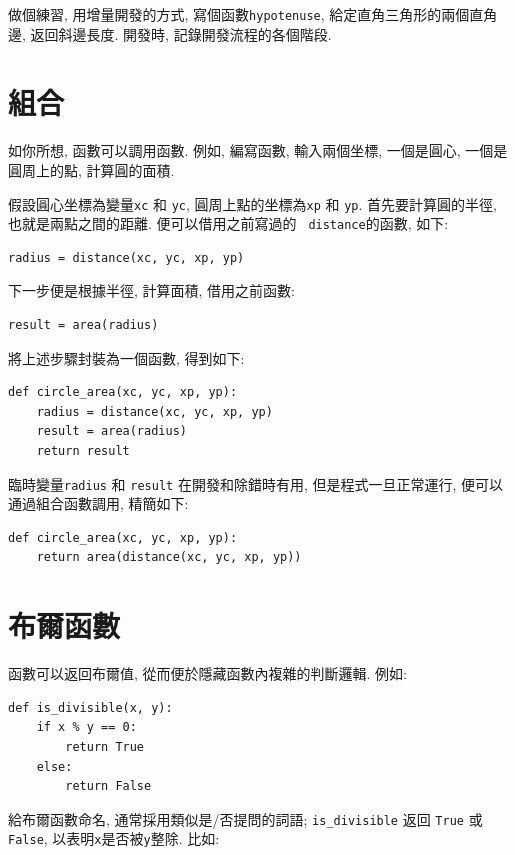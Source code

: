 \documentclass[10pt]{book}
\begin{document}
做個練習, 用增量開發的方式, 寫個函數{\tt hypotenuse}, 
給定直角三角形的兩個直角邊, 返回斜邊長度. 
開發時, 記錄開發流程的各個階段. 



\section{組合}

如你所想, 函數可以調用函數. 
例如, 編寫函數, 輸入兩個坐標, 一個是圓心, 一個是圓周上的點, 
計算圓的面積. 

假設圓心坐標為變量{\tt xc} 和
{\tt yc}, 圓周上點的坐標為{\tt xp} 和 {\tt yp}.
首先要計算圓的半徑, 也就是兩點之間的距離. 
便可以借用之前寫過的 {\tt
distance}的函數, 如下:

\begin{verbatim}
radius = distance(xc, yc, xp, yp)
\end{verbatim}
%
下一步便是根據半徑, 計算面積, 借用之前函數:

\begin{verbatim}
result = area(radius)
\end{verbatim}
%
將上述步驟封裝為一個函數, 得到如下:

\begin{verbatim}
def circle_area(xc, yc, xp, yp):
    radius = distance(xc, yc, xp, yp)
    result = area(radius)
    return result
\end{verbatim}
%
臨時變量{\tt radius} 和 {\tt result} 在開發和除錯時有用, 但是程式一旦正常運行, 
便可以通過組合函數調用, 精簡如下:

\begin{verbatim}
def circle_area(xc, yc, xp, yp):
    return area(distance(xc, yc, xp, yp))
\end{verbatim}
%

\section{布爾函數}
\label{boolean}

函數可以返回布爾值, 從而便於隱藏函數內複雜的判斷邏輯.  
例如:

\begin{verbatim}
def is_divisible(x, y):
    if x % y == 0:
        return True
    else:
        return False
\end{verbatim}
%
給布爾函數命名, 通常採用類似是/否提問的詞語; 
\verb"is_divisible" 返回 {\tt True} 或 {\tt False}, 
以表明{\tt x}是否被{\tt y}整除. 
比如:
\end{document}
